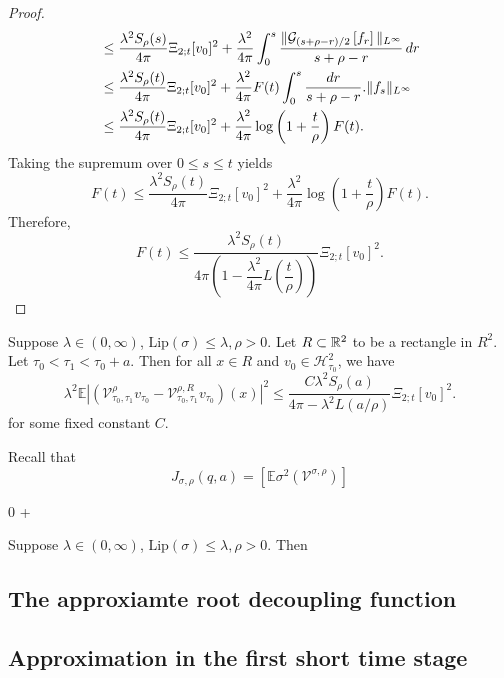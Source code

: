 \begin{proof}
\[\begin{aligned}
&\leq
\frac{\lambda^2 S_\rho(s)}{4\pi}
\Xi_{2;t}[v_0]^2
+
\frac{\lambda^2}{4\pi}
\int_0^s
\frac{
    \|\mathcal{G}_{(s+\rho-r)/2}\left[{f_r}\right]\|_{L^\infty}
}{
    s+\rho-r
}
\,dr
\\
&\leq
\frac{\lambda^2 S_\rho(t)}{4\pi}
\Xi_{2;t}[v_0]^2
+
\frac{\lambda^2}{4\pi}
F(t)
\int_0^s
\frac{dr}{s+\rho-r}.
\|f_s\|_{L^\infty} \\
&\leq
\frac{\lambda^2 S_\rho(t)}{4\pi}
\Xi_{2;t}[v_0]^2
+
\frac{\lambda^2}{4\pi}
\log\left(1+\frac{t}{\rho}\right)
F(t).
\end{aligned}
\]
Taking the supremum over $0\leq s\leq t$ yields
\[
F(t)
\leq
\frac{\lambda^2 S_\rho(t)}{4\pi}
\Xi_{2;t}[v_0]^2
+
\frac{\lambda^2}{4\pi}
\log\left(1+\frac{t}{\rho}\right)
F(t).
\]
Therefore,
\[
F(t) \leq \dfrac{
    \lambda^2 S_\rho(t)
}{
    4\pi
    \left(
        1-
        \dfrac{\lambda^2}{4\pi}
    L(\dfrac{t}{\rho})
    \right)
}
\Xi_{2;t}[v_0]^2.
\]
\end{proof}

\begin{proposition}
    Suppose $\lambda \in (0,\infty)$, $\text{Lip}(\sigma) \leq \lambda, \rho > 0$. Let $R\subset \mathbb{R}^2$ to be a rectangle in $R^2$. Let $\tau_0 < \tau_1 < \tau_0 +a$. Then for all $x\in R $ and $v_0 \in \mathscr{H}^2_{\tau_0}$, we have
    \[
    \lambda^2\mathbb{E}|(\mathcal{V}^{\rho}_{\tau_0,\tau_1}v_{\tau_0} - \mathcal{V}^{\rho,R}_{\tau_0,\tau_1}v_{\tau_0})(x)|^2 \leq \frac{
    C\lambda^2 S_\rho(a)
}{
    4\pi-\lambda^2
    L(a/\rho)
}
\Xi_{2;t}[v_0]^2.
    \]
    for some fixed constant $C$.
\end{proposition}

\begin{definition}
    Recall that
    \[
    J_{\sigma,\rho}(q,a) = \left[\mathbb{E} \sigma^2(\mathcal{V}^{\sigma,\rho})\right]
    \]
\end{definition}0 +

\begin{proposition}
    Suppose $\lambda \in (0,\infty)$, $\text{Lip}(\sigma) \leq \lambda, \rho > 0$. Then
\end{proposition}

\subsection{The approxiamte root decoupling function}


\subsection{Approximation in the first short time stage}

